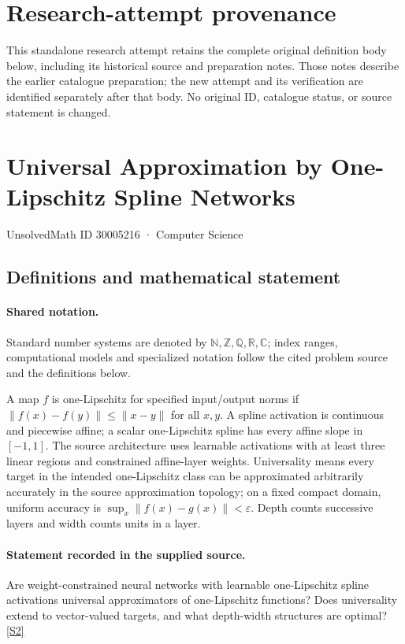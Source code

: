 \documentclass[11pt]{article}
\begin{document}
\section*{Research-attempt provenance}
This standalone research attempt retains the complete original definition body below,
including its historical source and preparation notes. Those notes describe the
earlier catalogue preparation; the new attempt and its verification are identified
separately after that body. No original ID, catalogue status, or source statement is changed.

\section{Universal Approximation by One-Lipschitz Spline Networks}\label{30005216}
{\small UnsolvedMath ID 30005216 · Computer Science}
\subsection{Definitions and mathematical statement}

\paragraph{Shared notation.}Standard number systems are denoted by $\mathbb N,\mathbb Z,\mathbb Q,\mathbb R,\mathbb C$; index ranges, computational models and specialized notation follow the cited problem source and the definitions below.


A map $f$ is one-Lipschitz for specified input/output norms if $\lVert f(x)-f(y)\rVert\leq\lVert x-y\rVert$ for all $x,y$. A spline activation is continuous and piecewise affine; a scalar one-Lipschitz spline has every affine slope in $[-1,1]$. The source architecture uses learnable activations with at least three linear regions and constrained affine-layer weights. Universality means every target in the intended one-Lipschitz class can be approximated arbitrarily accurately in the source approximation topology; on a fixed compact domain, uniform accuracy is $\sup_x\lVert f(x)-g(x)\rVert<\varepsilon$. Depth counts successive layers and width counts units in a layer.
\paragraph{Statement recorded in the supplied source.}
Are weight-constrained neural networks with learnable one-Lipschitz spline activations universal approximators of one-Lipschitz functions? Does universality extend to vector-valued targets, and what depth-width structures are optimal? \href{https://doi.org/10.4171/owr/2022/38}{[S2]}
\end{document}
